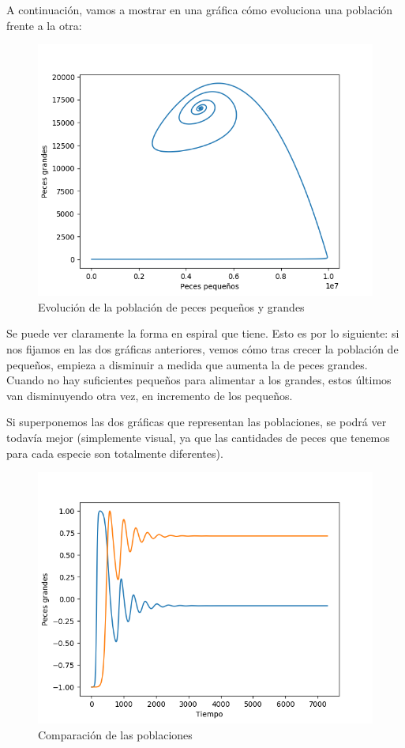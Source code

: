 \documentclass[11pt,a4paper]{report}
\begin{document}
A continuación, vamos a mostrar en una gráfica cómo evoluciona una población frente a la otra:

\begin{figure}[H]
\centering
\includegraphics[scale=0.5]{img/ambos-4000-25.png}
\caption{Evolución de la población de peces pequeños y grandes}
\end{figure}

Se puede ver claramente la forma en espiral que tiene. Esto es por lo siguiente: si nos fijamos en las dos gráficas anteriores, vemos cómo
tras crecer la población de pequeños, empieza a disminuir a medida que aumenta la de peces grandes. Cuando no hay suficientes pequeños
para alimentar a los grandes, estos últimos van disminuyendo otra vez, en incremento de los pequeños.

Si superponemos las dos gráficas que representan las poblaciones, se podrá ver todavía mejor (simplemente visual, ya que las cantidades de
peces que tenemos para cada especie son totalmente diferentes).

\begin{figure}[H]
\centering
\includegraphics[scale=0.5]{img/interp.png}
\caption{Comparación de las poblaciones}
\end{figure}
\end{document}
